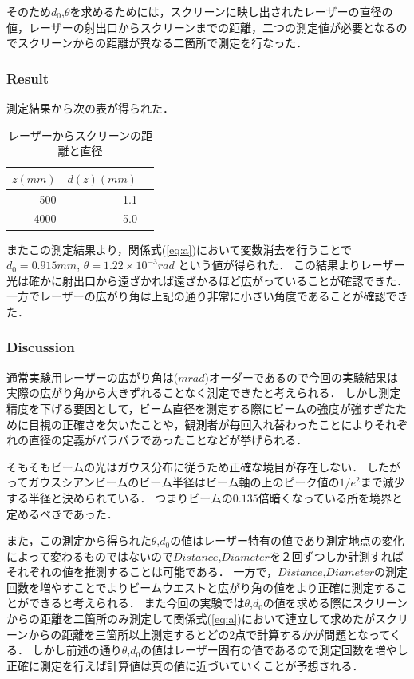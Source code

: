 \documentclass[11pt, a4paper]{jsarticle}
\begin{document}
そのため$d_0$,$\theta$を求めるためには，スクリーンに映し出されたレーザーの直径の値，レーザーの射出口からスクリーンまでの距離，二つの測定値が必要となるのでスクリーンからの距離が異なる二箇所で測定を行なった．

\newpage
\subsubsection{Result}
測定結果から次の表が得られた．
\begin{table}[htb]
  \begin{center}
    \caption{レーザーからスクリーンの距離と直径}
    \begin{tabular}{rrr} \hline
        $z(mm)$ & $d(z)(mm)$  \\ \hline
        500            & 1.1 \\
        4000           & 5.0 \\ \hline
    \end{tabular}
    \label{tab:a}
  \end{center}
\end{table}


またこの測定結果より，関係式(\ref{eq:a})において変数消去を行うことで$d_0 = 0.915mm$, $\theta = 1.22 \times 10 ^{-3}rad$
という値が得られた．
この結果よりレーザー光は確かに射出口から遠ざかれば遠ざかるほど広がっていることが確認できた．
一方でレーザーの広がり角は上記の通り非常に小さい角度であることが確認できた．
\subsubsection{Discussion}
通常実験用レーザーの広がり角は($mrad$)オーダーであるので今回の実験結果は実際の広がり角から大きずれることなく測定できたと考えられる．
しかし測定精度を下げる要因として，ビーム直径を測定する際にビームの強度が強すぎたために目視の正確さを欠いたことや，観測者が毎回入れ替わったことによりそれぞれの直径の定義がバラバラであったことなどが挙げられる．

そもそもビームの光はガウス分布に従うため正確な境目が存在しない．
したがってガウスシアンビームのビーム半径はビーム軸の上のピーク値の$1/e^2$まで減少する半径と決められている．
つまりビームの$0.135$倍暗くなっている所を境界と定めるべきであった．

また，この測定から得られた$\theta$,$d_0$の値はレーザー特有の値であり測定地点の変化によって変わるものではないので$Distance$,$Diameter$を２回ずつしか計測すればそれぞれの値を推測することは可能である．
一方で，$Distance$,$Diameter$の測定回数を増やすことでよりビームウエストと広がり角の値をより正確に測定することができると考えられる．
また今回の実験では$\theta$,$d_0$の値を求める際にスクリーンからの距離を二箇所のみ測定して関係式(\ref{eq:a})において連立して求めたがスクリーンからの距離を三箇所以上測定するとどの2点で計算するかが問題となってくる．
しかし前述の通り$\theta$,$d_0$の値はレーザー固有の値であるので測定回数を増やし正確に測定を行えば計算値は真の値に近づいていくことが予想される．
\end{document}
